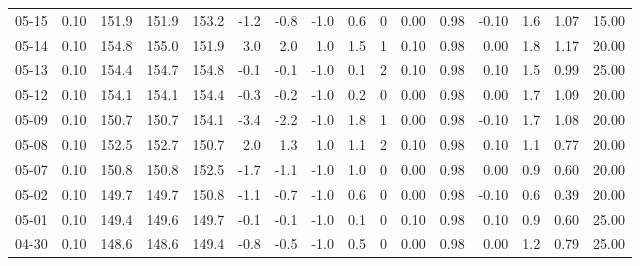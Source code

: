 \begin{threeparttable}
{\begin{tabular}{lrrrrrrrrrrrrrrr}
  05-15 &     0.10 & 151.9 & 151.9 & 153.2 &       -1.2 &           -0.8 &                     -1.0 &                 0.6 &              0 &       0.00 &      0.98 &          -0.10 &              1.6 &            1.07 &                  15.00 \\
  05-14 &     0.10 & 154.8 & 155.0 & 151.9 &        3.0 &            2.0 &                      1.0 &                 1.5 &              1 &       0.10 &      0.98 &           0.00 &              1.8 &            1.17 &                  20.00 \\
  05-13 &     0.10 & 154.4 & 154.7 & 154.8 &       -0.1 &           -0.1 &                     -1.0 &                 0.1 &              2 &       0.10 &      0.98 &           0.10 &              1.5 &            0.99 &                  25.00 \\
  05-12 &     0.10 & 154.1 & 154.1 & 154.4 &       -0.3 &           -0.2 &                     -1.0 &                 0.2 &              0 &       0.00 &      0.98 &           0.00 &              1.7 &            1.09 &                  20.00 \\
  05-09 &     0.10 & 150.7 & 150.7 & 154.1 &       -3.4 &           -2.2 &                     -1.0 &                 1.8 &              1 &       0.00 &      0.98 &          -0.10 &              1.7 &            1.08 &                  20.00 \\
  05-08 &     0.10 & 152.5 & 152.7 & 150.7 &        2.0 &            1.3 &                      1.0 &                 1.1 &              2 &       0.10 &      0.98 &           0.10 &              1.1 &            0.77 &                  20.00 \\
  05-07 &     0.10 & 150.8 & 150.8 & 152.5 &       -1.7 &           -1.1 &                     -1.0 &                 1.0 &              0 &       0.00 &      0.98 &           0.00 &              0.9 &            0.60 &                  20.00 \\
  05-02 &     0.10 & 149.7 & 149.7 & 150.8 &       -1.1 &           -0.7 &                     -1.0 &                 0.6 &              0 &       0.00 &      0.98 &          -0.10 &              0.6 &            0.39 &                  20.00 \\
  05-01 &     0.10 & 149.4 & 149.6 & 149.7 &       -0.1 &           -0.1 &                     -1.0 &                 0.1 &              0 &       0.10 &      0.98 &           0.10 &              0.9 &            0.60 &                  25.00 \\
  04-30 &     0.10 & 148.6 & 148.6 & 149.4 &       -0.8 &           -0.5 &                     -1.0 &                 0.5 &              0 &       0.00 &      0.98 &           0.00 &              1.2 &            0.79 &                  25.00 \\

\end{tabular}}
\end{threeparttable}
